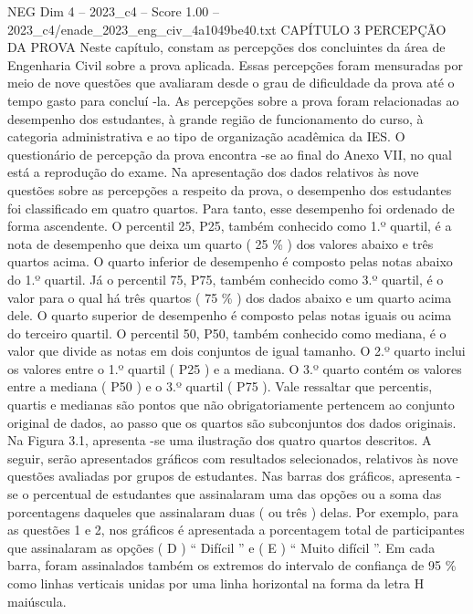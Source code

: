 \begin{textsample}{NEG Dim 4 – 2023\_c4 – Score 1.00 – 2023\_c4/enade\_2023\_eng\_civ\_4a1049be40.txt}  \label{ex:f4_neg_191}
CAPÍTULO 3 PERCEPÇÃO DA PROVA Neste capítulo, constam as percepções dos concluintes da área de Engenharia Civil sobre a prova aplicada.
Essas percepções foram mensuradas por meio de nove questões que avaliaram desde o grau de dificuldade da prova até o tempo gasto para concluí -la.
As percepções sobre a prova foram relacionadas ao desempenho dos estudantes, à grande região de funcionamento do curso, à categoria administrativa e ao tipo de organização acadêmica da IES.
O questionário de percepção da prova encontra -se ao final do Anexo VII, no qual está a reprodução do exame.
Na apresentação dos dados relativos às nove questões sobre as percepções a respeito da prova, o desempenho dos estudantes foi classificado em quatro quartos.
Para tanto, esse desempenho foi ordenado de forma ascendente.
O percentil 25, P25, também conhecido como 1.º quartil, é a nota de desempenho que deixa um quarto ( 25 \% ) dos valores abaixo e três quartos acima.
O quarto inferior de desempenho é composto pelas notas abaixo do 1.º quartil.
Já o percentil 75, P75, também conhecido como 3.º quartil, é o valor para o qual há três quartos ( 75 \% ) dos dados abaixo e um quarto acima dele.
O quarto superior de desempenho é composto pelas notas iguais ou acima do terceiro quartil.
O percentil 50, P50, também conhecido como mediana, é o valor que divide as notas em dois conjuntos de igual tamanho.
O 2.º quarto inclui os valores entre o 1.º quartil ( P25 ) e a mediana.
O 3.º quarto contém os valores entre a mediana ( P50 ) e o 3.º quartil ( P75 ).
Vale ressaltar que percentis, quartis e medianas são pontos que não obrigatoriamente pertencem ao conjunto original de dados, ao passo que os quartos são subconjuntos dos dados originais.
Na Figura 3.1, apresenta -se uma ilustração dos quatro quartos descritos.
A seguir, serão apresentados gráficos com resultados selecionados, relativos às nove questões avaliadas por grupos de estudantes.
Nas barras dos gráficos, apresenta -se o percentual de estudantes que assinalaram uma das opções ou a soma das porcentagens daqueles que assinalaram duas ( ou três ) delas.
Por exemplo, para as questões 1 e 2, nos gráficos é apresentada a porcentagem total de participantes que assinalaram as opções ( D ) “ Difícil ” e ( E ) “ Muito difícil ”.
Em cada barra, foram assinalados também os extremos do intervalo de confiança de 95 \% como linhas verticais unidas por uma linha horizontal na forma da letra H maiúscula.

\end{textsample}
